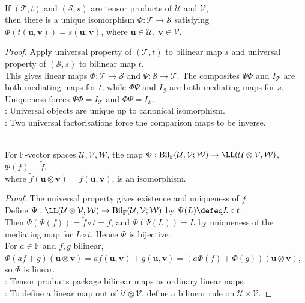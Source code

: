 \begin{corollary} \label{cor:tensor-product-unique-up-to-isomorphism} \\
If $(\mathcal{T},t)$ and $(\mathcal{S},s)$ are tensor products of $\mathcal{U}$ and $\mathcal{V}$,\\
then there is a unique isomorphism $\Phi:\mathcal{T}\to\mathcal{S}$ satisfying $\Phi(t(\mathbf{u},\mathbf{v}))=s(\mathbf{u},\mathbf{v})$, where $\mathbf{u}\in\mathcal{U},\ \mathbf{v}\in\mathcal{V}$.
\begin{proof}
Apply universal property of $(\mathcal{T},t)$ to bilinear map $s$ and universal property of $(\mathcal{S},s)$ to bilinear map $t$.\\
This gives linear maps $\Phi:\mathcal{T}\to\mathcal{S}$ and $\Psi:\mathcal{S}\to\mathcal{T}$. The composites $\Psi\Phi$ and $I_{\mathcal{T}}$ are both mediating maps for $t$, while $\Phi\Psi$ and $I_{\mathcal{S}}$ are both mediating maps for $s$. Uniqueness forces $\Psi\Phi=I_{\mathcal{T}}$ and $\Phi\Psi=I_{\mathcal{S}}$.\\
: Universal objects are unique up to canonical isomorphism.\\
: Two universal factorisations force the comparison maps to be inverse.
\end{proof}
\end{corollary}

\begin{theorem} \label{thm:tensor-linearizes-bilinear-maps} \\
For $\mathbb{F}$-vector spaces $\mathcal{U},\mathcal{V},\mathcal{W}$, the map $\Phi:\operatorname{Bil}_{\mathbb{F}}(\mathcal{U},\mathcal{V};\mathcal{W})\to\LL(\mathcal{U}\otimes\mathcal{V},\mathcal{W})$, $\Phi(f)=\widetilde{f}$,\\
where $\widetilde{f}(\mathbf{u}\otimes\mathbf{v})=f(\mathbf{u},\mathbf{v})$, is an isomorphism.
\begin{proof}
The universal property gives existence and uniqueness of $\widetilde{f}$.\\
Define $\Psi:\LL(\mathcal{U}\otimes\mathcal{V},\mathcal{W})\to\operatorname{Bil}_{\mathbb{F}}(\mathcal{U},\mathcal{V};\mathcal{W})$ by $\Psi(L)\defeq L\circ t$.\\
Then $\Psi(\Phi(f))=\widetilde{f}\circ t=f$, and $\Phi(\Psi(L))=L$ by uniqueness of the mediating map for $L\circ t$. Hence $\Phi$ is bijective.\\
For $a\in\mathbb{F}$ and $f,g$ bilinear, $\Phi(af+g)(\mathbf{u}\otimes\mathbf{v})=af(\mathbf{u},\mathbf{v})+g(\mathbf{u},\mathbf{v})=(a\Phi(f)+\Phi(g))(\mathbf{u}\otimes\mathbf{v})$, so $\Phi$ is linear.\\
: Tensor products package bilinear maps as ordinary linear maps.\\
: To define a linear map out of $\mathcal{U}\otimes\mathcal{V}$, define a bilinear rule on $\mathcal{U}\times\mathcal{V}$.
\end{proof}
\end{theorem}


